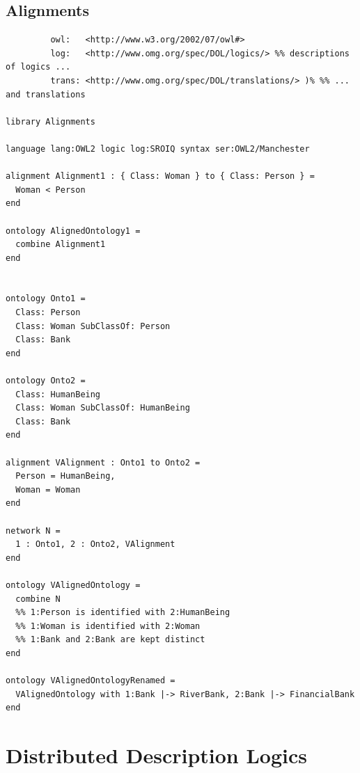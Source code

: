 \documentclass[10pt,fleqn,%
\ifpretendfinal
final%
\else
draft%
\fi,
]{scrreprt}
\newcommand{\sclause}[1]{\section{#1}}
\newcommand{\ssclause}[1]{\subsection{#1}}
\begin{document}
\ssclause{Alignments}
\begin{lstlisting}[basicstyle=\ttfamily,language=dolText,morekeywords={props,ObjectProperty,Class,DisjointUnionOf,SubClassOf,Characteristics,Transitive,Asymmetric,SubPropertyOf,DisjointClasses,EquivalentTo,inverse,only,forall,iff,if,or,exists,bridge,distributed},escapechar=@,mathescape]
%prefix( :     <http://www.example.org/alignment#>
         owl:   <http://www.w3.org/2002/07/owl#>
         log:   <http://www.omg.org/spec/DOL/logics/> %% descriptions of logics ...
         trans: <http://www.omg.org/spec/DOL/translations/> )% %% ... and translations

library Alignments

language lang:OWL2 logic log:SROIQ syntax ser:OWL2/Manchester

alignment Alignment1 : { Class: Woman } to { Class: Person } =
  Woman < Person
end

ontology AlignedOntology1 =
  combine Alignment1
end


ontology Onto1 =
  Class: Person
  Class: Woman SubClassOf: Person
  Class: Bank
end

ontology Onto2 =
  Class: HumanBeing
  Class: Woman SubClassOf: HumanBeing
  Class: Bank
end

alignment VAlignment : Onto1 to Onto2 =
  Person = HumanBeing,
  Woman = Woman
end

network N =
  1 : Onto1, 2 : Onto2, VAlignment
end
 
ontology VAlignedOntology =
  combine N
  %% 1:Person is identified with 2:HumanBeing
  %% 1:Woman is identified with 2:Woman
  %% 1:Bank and 2:Bank are kept distinct
end

ontology VAlignedOntologyRenamed =
  VAlignedOntology with 1:Bank |-> RiverBank, 2:Bank |-> FinancialBank
end

\end{lstlisting}


\sclause{Distributed Description Logics}
\end{document}
